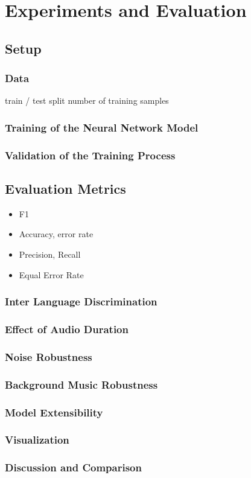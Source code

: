 \section{Experiments and Evaluation} 
\label{sec:evaluation}

\subsection{Setup} 
\label{sec:setup}
\subsubsection{Data} 
\label{sec:data}
train / test split
number of training samples

\subsubsection{Training of the Neural Network Model} 
\label{sec:training}
\subsubsection{Validation of the Training Process} 
\label{sec:validation}

\subsection{Evaluation Metrics} 
\label{sec:metrics}
\begin{itemize}
    \item F1
    \item Accuracy, error rate
    \item Precision, Recall
    \item Equal Error Rate
\end{itemize}

\subsubsection{Inter Language Discrimination} 
\label{sec:lang_discrimination}
\subsubsection{Effect of Audio Duration} 
\label{sec:duration}
\subsubsection{Noise Robustness} 
\label{sec:noise_robustness}
\subsubsection{Background Music Robustness} 
\label{sec:music_robustness}
\subsubsection{Model Extensibility} 
\label{sec:extensibility}
\subsubsection{Visualization} 
\label{sec:visualization}

\subsubsection{Discussion and Comparison} 
\label{sec:comparison}
